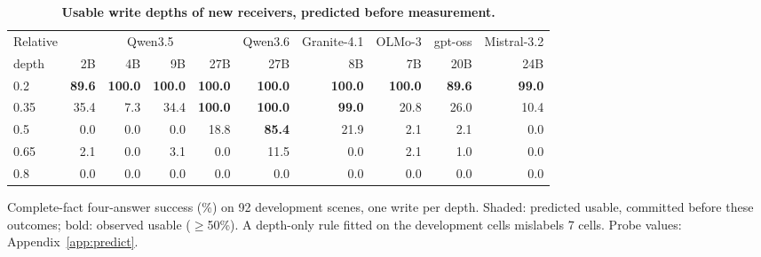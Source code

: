 \begin{table}[t]
\caption{\textbf{Usable write depths of new receivers, predicted before measurement.}}
\label{tab:predict}
\centering\small
\setlength{\tabcolsep}{3pt}\renewcommand{\arraystretch}{1.1}
\begin{tabular*}{\linewidth}{@{\extracolsep{\fill}}lrrrrrrrrr@{}}
\toprule
Relative & \multicolumn{4}{c}{Qwen3.5} & Qwen3.6 & Granite-4.1 & OLMo-3 & gpt-oss & Mistral-3.2 \\\cmidrule(lr){2-5}
depth & 2B & 4B & 9B & 27B & 27B & 8B & 7B & 20B & 24B \\
\midrule
0.2 & \cellcolor{parity}\textbf{89.6} & \cellcolor{parity}\textbf{100.0} & \cellcolor{parity}\textbf{100.0} & \cellcolor{parity}\textbf{100.0} & \cellcolor{parity}\textbf{100.0} & \cellcolor{parity}\textbf{100.0} & \cellcolor{parity}\textbf{100.0} & \cellcolor{parity}\textbf{89.6} & \cellcolor{parity}\textbf{99.0} \\
0.35 & 35.4 & 7.3 & 34.4 & \cellcolor{parity}\textbf{100.0} & \cellcolor{parity}\textbf{100.0} & \cellcolor{parity}\textbf{99.0} & 20.8 & 26.0 & 10.4 \\
0.5 & 0.0 & 0.0 & 0.0 & 18.8 & \cellcolor{parity}\textbf{85.4} & 21.9 & 2.1 & 2.1 & 0.0 \\
0.65 & 2.1 & 0.0 & 3.1 & 0.0 & 11.5 & 0.0 & 2.1 & 1.0 & 0.0 \\
0.8 & 0.0 & 0.0 & 0.0 & 0.0 & 0.0 & 0.0 & 0.0 & 0.0 & 0.0 \\
\bottomrule
\end{tabular*}
\par\vspace{3pt}
{\footnotesize\raggedright Complete-fact four-answer success (\%) on 92 development scenes, one write per depth. Shaded: predicted usable, committed before these outcomes; bold: observed usable ($\ge$50\%). A depth-only rule fitted on the development cells mislabels 7 cells. Probe values: Appendix~\ref{app:predict}.\par}
\end{table}
